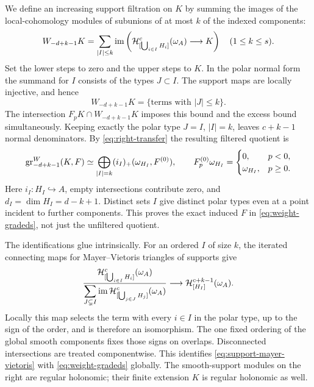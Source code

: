 We define an increasing support filtration on \(K\) by summing the
images of the local-cohomology modules of subunions of at most \(k\)
of the indexed components:
\begin{equation}\label{eq:support-weight}
 W_{-d+k-1}K=
 \sum_{|I|\leq k}\operatorname{im}\left(
 \mathcal H^c_{[\bigcup_{i\in I}H_i]}(\omega_A)\longrightarrow K\right)
 \quad(1\leq k\leq s).
\end{equation}
Set the lower steps to zero and the upper steps to \(K\).  In the polar
normal form the summand for \(I\) consists of the types \(J\subset I\).
The support maps are locally injective, and hence
\[
 W_{-d+k-1}K=\{\text{terms with }|J|\leq k\}.
\]
The intersection \(F_pK\cap W_{-d+k-1}K\) imposes this bound and the
excess bound simultaneously.  Keeping exactly the polar type \(J=I\),
\(|I|=k\), leaves \(c+k-1\) normal denominators.  By
\eqref{eq:right-transfer} the resulting filtered quotient is
\begin{equation}\label{eq:weight-gradeds}
 \operatorname{gr}^W_{-d+k-1}(K,F)
 \simeq\bigoplus_{|I|=k}(i_I)_+(\omega_{H_I},F^{(0)}),
 \qquad
 F^{(0)}_p\omega_{H_I}=
 \begin{cases}0,&p<0,\\ \omega_{H_I},&p\geq0.
 \end{cases}
\end{equation}
Here \(i_I:H_I\hookrightarrow A\), empty intersections contribute zero,
and \(d_I=\dim H_I=d-k+1\).  Distinct sets \(I\) give distinct polar
types even at a point incident to further components.  This proves the
exact induced \(F\) in \eqref{eq:weight-gradeds}, not just the unfiltered
quotient.

The identifications glue intrinsically.  For an ordered \(I\) of size
\(k\), the iterated connecting maps for Mayer--Vietoris triangles of
supports give
\begin{equation}\label{eq:support-mayer-vietoris}
 \frac{\mathcal H^c_{[\bigcup_{i\in I}H_i]}(\omega_A)}
 {\displaystyle\sum_{J\subsetneq I}\operatorname{im}
   \mathcal H^c_{[\bigcup_{j\in J}H_j]}(\omega_A)}
 \longrightarrow \mathcal H^{c+k-1}_{[H_I]}(\omega_A).
\end{equation}
Locally this map selects the term with every \(i\in I\) in the polar
type, up to the sign of the order, and is therefore an isomorphism.
The one fixed ordering of the global smooth components fixes those signs
on overlaps.  Disconnected intersections are treated componentwise.
This identifies \eqref{eq:support-mayer-vietoris} with
\eqref{eq:weight-gradeds} globally.  The smooth-support modules on the
right are regular holonomic; their finite extension \(K\) is regular
holonomic as well.

